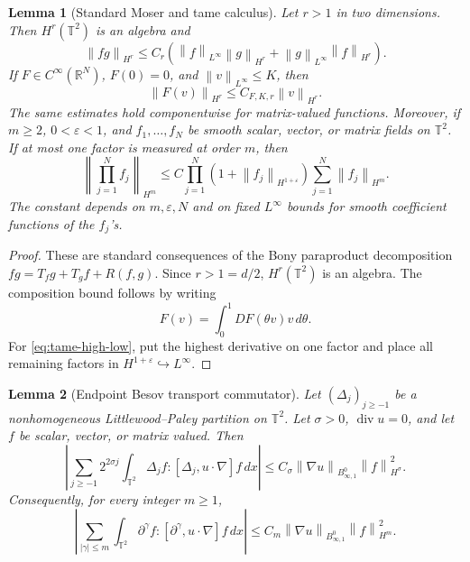 \documentclass[11pt]{article}
\newtheorem{lemma}{Lemma}[section]
\newcommand{\T}{\mathbb T}
\newcommand{\R}{\mathbb R}
\newcommand{\divv}{\operatorname{div}}
\newcommand{\eps}{\varepsilon}
\newcommand{\norm}[1]{\left\lVert #1\right\rVert}
\begin{document}
\begin{lemma}[Standard Moser and tame calculus]
\label{lem:moser}
\label{lem:tame-high-low}
Let \(r>1\) in two dimensions.  Then \(H^r(\T^2)\) is an algebra and
\[
  \norm{fg}_{H^r}
  \le C_r\left(\norm{f}_{L^\infty}\norm{g}_{H^r}
  +\norm{g}_{L^\infty}\norm{f}_{H^r}\right).
  \label{eq:moser-product}
\]
If \(F\in C^\infty(\R^N)\), \(F(0)=0\), and
\(\norm{v}_{L^\infty}\le K\), then
\[
  \norm{F(v)}_{H^r}\le C_{F,K,r}\norm{v}_{H^r}.
  \label{eq:moser-composition}
\]
The same estimates hold componentwise for matrix-valued functions.
Moreover, if \(m\ge2\), \(0<\eps<1\), and
\(f_1,\ldots,f_N\) be smooth scalar, vector, or matrix fields on \(\T^2\).  If
at most one factor is measured at order \(m\), then
\[
  \norm{\prod_{j=1}^N f_j}_{H^m}
  \le
  C\prod_{j=1}^N\left(1+\norm{f_j}_{H^{1+\eps}}\right)
  \sum_{j=1}^N\norm{f_j}_{H^m}.
  \label{eq:tame-high-low}
\]
The constant depends on \(m,\eps,N\) and on fixed \(L^\infty\) bounds for
smooth coefficient functions of the \(f_j\)'s.
\end{lemma}

\begin{proof}
These are standard consequences of the Bony paraproduct decomposition
\(fg=T_f g+T_g f+R(f,g)\).  Since \(r>1=d/2\), \(H^r(\T^2)\) is an algebra.
The composition bound follows by writing
\[
  F(v)=\int_0^1 DF(\theta v)v\,d\theta .
\]
For \eqref{eq:tame-high-low}, put the highest derivative on one factor and
place all remaining factors in \(H^{1+\eps}\hookrightarrow L^\infty\).
\end{proof}

\begin{lemma}[Endpoint Besov transport commutator]
\label{lem:endpoint-transport}
Let \((\Delta_j)_{j\ge -1}\) be a nonhomogeneous Littlewood--Paley partition
on \(\T^2\).  Let \(\sigma>0\), \(\divv u=0\), and let \(f\) be scalar,
vector, or matrix valued.  Then
\[
  \left|
  \sum_{j\ge -1}2^{2\sigma j}
  \int_{\T^2}\Delta_j f:
  [\Delta_j,u\cdot\nabla]f\,dx
  \right|
  \le
  C_\sigma\norm{\nabla u}_{B^0_{\infty,1}}\norm{f}_{H^\sigma}^2.
  \label{eq:endpoint-transport-dyadic}
\]
Consequently, for every integer \(m\ge1\),
\[
  \left|
  \sum_{|\gamma|\le m}
  \int_{\T^2}\partial^\gamma f:
  [\partial^\gamma,u\cdot\nabla]f\,dx
  \right|
  \le
  C_m\norm{\nabla u}_{B^0_{\infty,1}}\norm{f}_{H^m}^2.
  \label{eq:endpoint-transport}
\]
\end{lemma}
\end{document}
